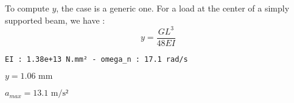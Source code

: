 To compute \(y\), the case is a generic one. For a load at the center of
a simply supported beam, we have : \[ y= \frac{GL^3}{48EI} \]

\begin{Shaded}
\begin{Highlighting}[]
\OperatorTok{=}  
\OperatorTok{=}  
\OperatorTok{=} 
\OperatorTok{=} 

\NormalTok{(}\SpecialCharTok{\{}\NormalTok{)}
\end{Highlighting}
\end{Shaded}

\begin{verbatim}
EI : 1.38e+13 N.mm² - omega_n : 17.1 rad/s
\end{verbatim}

\begin{Shaded}
\begin{Highlighting}[]
\OperatorTok{=}\OperatorTok{*}\OperatorTok{**} \OperatorTok{/}  \OperatorTok{/}
\SpecialStringTok{ }\CharTok{\textbackslash{}\textbackslash{}}\CharTok{\{\{}\NormalTok{))}

\OperatorTok{=}\OperatorTok{**} \OperatorTok{*}\OperatorTok{*}\OperatorTok{/} \OperatorTok{/}\OperatorTok{*} 
\CharTok{\{\{}\SpecialCharTok{\{}\SpecialStringTok{ }\CharTok{\textbackslash{}\textbackslash{}}\CharTok{\{\{}\NormalTok{))}
\end{Highlighting}
\end{Shaded}

$y = 1.06 \text{ mm}$

$a_{max} = 13.1 \text{ m/s²}$

